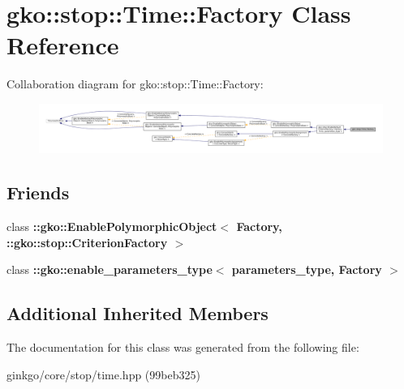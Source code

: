 \hypertarget{classgko_1_1stop_1_1Time_1_1Factory}{}\section{gko\+:\+:stop\+:\+:Time\+:\+:Factory Class Reference}
\label{classgko_1_1stop_1_1Time_1_1Factory}


Collaboration diagram for gko\+:\+:stop\+:\+:Time\+:\+:Factory\+:
\nopagebreak
\begin{figure}[H]
\begin{center}
\leavevmode
\includegraphics[width=350pt]{classgko_1_1stop_1_1Time_1_1Factory__coll__graph}
\end{center}
\end{figure}
\subsection*{Friends}
\begin{DoxyCompactItemize}
\item 
\mbox{\label{classgko_1_1stop_1_1Time_1_1Factory_aaa5507cf00e5361a77971746fefa42e6}} 
class {\bfseries \+::gko\+::\+Enable\+Polymorphic\+Object$<$ Factory, \+::gko\+::stop\+::\+Criterion\+Factory $>$}
\item 
\mbox{\label{classgko_1_1stop_1_1Time_1_1Factory_a0d176cbd42d6214e11aee8c30ca256fc}} 
class {\bfseries \+::gko\+::enable\+\_\+parameters\+\_\+type$<$ parameters\+\_\+type, Factory $>$}
\end{DoxyCompactItemize}
\subsection*{Additional Inherited Members}


The documentation for this class was generated from the following file\+:\begin{DoxyCompactItemize}
\item 
ginkgo/core/stop/time.\+hpp (99beb325)\end{DoxyCompactItemize}
